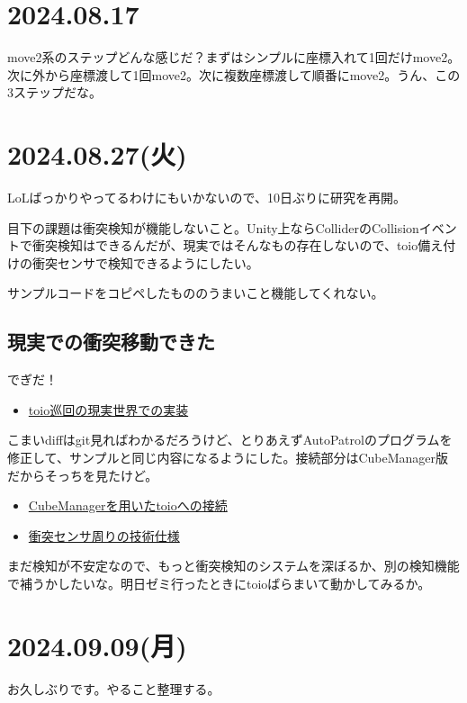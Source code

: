 \documentclass[twocolumn]{mynote}
\begin{document}
\section*{2024.08.17}
move2系のステップどんな感じだ？まずはシンプルに座標入れて1回だけmove2。次に外から座標渡して1回move2。次に複数座標渡して順番にmove2。うん、この3ステップだな。

\section*{2024.08.27(火)}
LoLばっかりやってるわけにもいかないので、10日ぶりに研究を再開。

目下の課題は衝突検知が機能しないこと。Unity上ならColliderのCollisionイベントで衝突検知はできるんだが、現実ではそんなもの存在しないので、toio備え付けの衝突センサで検知できるようにしたい。

サンプルコードをコピペしたもののうまいこと機能してくれない。

\subsection*{現実での衝突移動できた}
でぎだ！

\begin{itemize}
  \item \href{https://www.youtube.com/watch?v=-0CJAu6-GsE}{toio巡回の現実世界での実装}
\end{itemize}

こまいdiffはgit見ればわかるだろうけど、とりあえずAutoPatrolのプログラムを修正して、サンプルと同じ内容になるようにした。接続部分はCubeManager版だからそっちを見たけど。

\begin{itemize}
  \item \href{https://morikatron.github.io/toio-sdk-for-unity/docs/tutorials_basic.html#9-cubemanager\%E3\%82\%AF\%E3\%83\%A9\%E3\%82\%B9\%E3\%82\%92\%E7\%94\%A8\%E3\%81\%84\%E3\%81\%9F\%E3\%82\%BD\%E3\%83\%BC\%E3\%82\%B9\%E3\%82\%B3\%E3\%83\%BC\%E3\%83\%89\%E3\%81\%AE\%E7\%B0\%A1\%E7\%95\%A5\%E5\%8C\%96}{CubeManagerを用いたtoioへの接続}
  \item \href{https://toio.github.io/toio-spec/docs/ble_sensor/}{衝突センサ周りの技術仕様}
\end{itemize}

まだ検知が不安定なので、もっと衝突検知のシステムを深ぼるか、別の検知機能で補うかしたいな。明日ゼミ行ったときにtoioばらまいて動かしてみるか。

\section*{2024.09.09(月)}
お久しぶりです。やること整理する。
\end{document}
